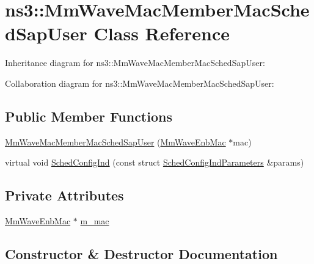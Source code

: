 \hypertarget{classns3_1_1MmWaveMacMemberMacSchedSapUser}{}\section{ns3\+:\+:Mm\+Wave\+Mac\+Member\+Mac\+Sched\+Sap\+User Class Reference}
\label{classns3_1_1MmWaveMacMemberMacSchedSapUser}


Inheritance diagram for ns3\+:\+:Mm\+Wave\+Mac\+Member\+Mac\+Sched\+Sap\+User\+:


Collaboration diagram for ns3\+:\+:Mm\+Wave\+Mac\+Member\+Mac\+Sched\+Sap\+User\+:
\subsection*{Public Member Functions}
\begin{DoxyCompactItemize}
\item 
\hyperlink{classns3_1_1MmWaveMacMemberMacSchedSapUser_a3f039a23d312970cb6b755c8af8a24f5}{Mm\+Wave\+Mac\+Member\+Mac\+Sched\+Sap\+User} (\hyperlink{classns3_1_1MmWaveEnbMac}{Mm\+Wave\+Enb\+Mac} $\ast$mac)
\item 
virtual void \hyperlink{classns3_1_1MmWaveMacMemberMacSchedSapUser_a89b35ddc9e50bb67d66b781b1d66d00d}{Sched\+Config\+Ind} (const struct \hyperlink{structns3_1_1MmWaveMacSchedSapUser_1_1SchedConfigIndParameters}{Sched\+Config\+Ind\+Parameters} \&params)
\end{DoxyCompactItemize}
\subsection*{Private Attributes}
\begin{DoxyCompactItemize}
\item 
\hyperlink{classns3_1_1MmWaveEnbMac}{Mm\+Wave\+Enb\+Mac} $\ast$ \hyperlink{classns3_1_1MmWaveMacMemberMacSchedSapUser_ad26522db9de8015a589129243b8ed387}{m\+\_\+mac}
\end{DoxyCompactItemize}


\subsection{Constructor \& Destructor Documentation}
